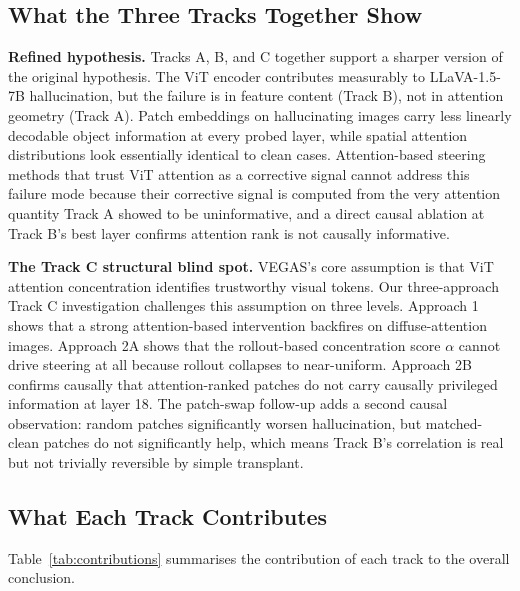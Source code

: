 \documentclass[11pt]{article}
\begin{document}
\subsection{What the Three Tracks Together Show}

\textbf{Refined hypothesis.} Tracks A, B, and C together support a sharper version of
the original hypothesis. The ViT encoder contributes measurably to LLaVA-1.5-7B
hallucination, but the failure is in feature content (Track B), not in attention
geometry (Track A). Patch embeddings on hallucinating images carry less linearly
decodable object information at every probed layer, while spatial attention distributions
look essentially identical to clean cases. Attention-based steering methods that trust
ViT attention as a corrective signal cannot address this failure mode because their
corrective signal is computed from the very attention quantity Track A showed to be
uninformative, and a direct causal ablation at Track B's best layer confirms attention
rank is not causally informative.

\textbf{The Track C structural blind spot.} VEGAS's core assumption is that ViT
attention concentration identifies trustworthy visual tokens. Our three-approach Track
C investigation challenges this assumption on three levels. Approach 1 shows that a
strong attention-based intervention backfires on diffuse-attention images. Approach 2A
shows that the rollout-based concentration score $\alpha$ cannot drive steering at all
because rollout collapses to near-uniform. Approach 2B confirms causally that
attention-ranked patches do not carry causally privileged information at layer 18. The
patch-swap follow-up adds a second causal observation: random patches significantly
worsen hallucination, but matched-clean patches do not significantly help, which means
Track B's correlation is real but not trivially reversible by simple transplant.

\subsection{What Each Track Contributes}

Table~\ref{tab:contributions} summarises the contribution of each track to the overall
conclusion.
\end{document}
